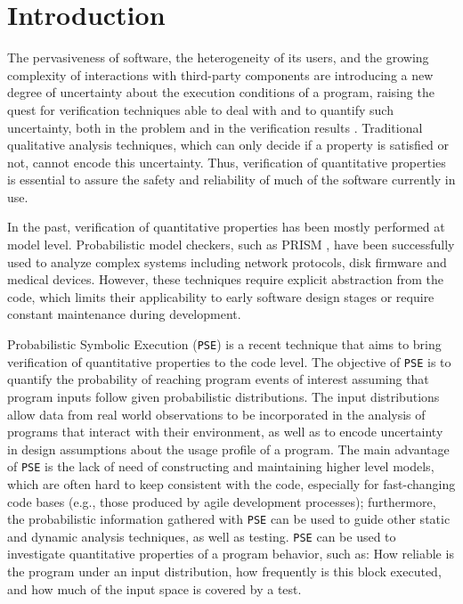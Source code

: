 \documentclass[10pt]{article}
\newcounter{list}
\begin{document}
\newcommand{\PSE}{\texttt{PSE}}
\newcommand{\qCORAL}{\texttt{qCORAL}}
\newcommand{\PC}{\textit{PC}}
\raisebox{1cm}

\vspace{-20mm}
\section{Introduction}

The pervasiveness of software, the heterogeneity of its users, and the
growing complexity of interactions with third-party components are
introducing a new degree of uncertainty about the execution conditions
of a program, raising the quest for verification techniques able to
deal with and to quantify such uncertainty, both in the problem and in
the verification results \cite{borges2015iterative}. Traditional
qualitative analysis techniques, which can only decide if a property
is satisfied or not, cannot encode this uncertainty.  Thus,
verification of quantitative properties is essential to assure the
safety and reliability of much of the software currently in use.

In the past, verification of quantitative properties has been mostly
performed at model level. Probabilistic model checkers, such as PRISM
\cite{kwiatkowska2011prism}, have been successfully used to analyze
complex systems including network protocols, disk firmware and medical
devices.  However, these techniques require explicit abstraction from
the code, which limits their applicability to early software design
stages or require constant maintenance during development.

Probabilistic Symbolic Execution (\PSE{})
\cite{geldenhuys2012probabilistic,filieri2013reliability} is a recent
technique that aims to bring verification of quantitative properties
to the code level. The objective of \PSE{} \cite{borges2015iterative}
is to quantify the probability of reaching program events of interest
assuming that program inputs follow given probabilistic
distributions. The input distributions allow data from real world
observations to be incorporated in the analysis of programs that
interact with their environment, as well as to encode uncertainty in
design assumptions about the usage profile of a program. The main
advantage of \PSE{} is the lack of need of constructing and
maintaining higher level models, which are often hard to keep
consistent with the code, especially for fast-changing code bases
(e.g., those produced by agile development processes); furthermore, the
probabilistic information gathered with \PSE{} can be used to guide other
static and dynamic analysis techniques, as well as testing. \PSE{} can
be used to investigate quantitative properties of a program behavior,
such as: How reliable is the program under an input distribution, how
frequently is this block executed, and how much of the input space is
covered by a test.
\end{document}
